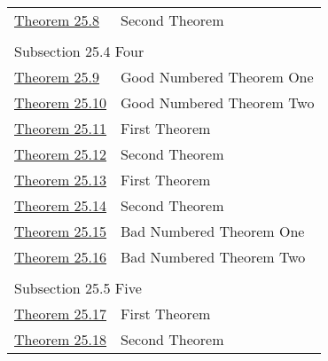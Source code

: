 \documentclass[10pt,]{article}
\theoremstyle{plain}
\theoremstyle{definition}
\theoremstyle{definition}
\theoremstyle{definition}
\theoremstyle{definition}
\theoremstyle{definition}
\theoremstyle{definition}
\numberwithin{equation}{section}
\begin{document}
\begin{longtable}[l]{ll}
\hyperref[theorem-number-08]{Theorem 25.8}& Second Theorem\\
\multicolumn{2}{l}{\null}\\[1.5ex] \multicolumn{2}{l}{\large Subsection 25.4 Four}\\[0.5ex]
\hyperref[theorem-good-one]{Theorem 25.9}& Good Numbered Theorem One\\
\hyperref[theorem-good-two]{Theorem 25.10}& Good Numbered Theorem Two\\
\hyperref[theorem-number-09]{Theorem 25.11}& First Theorem\\
\hyperref[theorem-number-10]{Theorem 25.12}& Second Theorem\\
\hyperref[theorem-number-11]{Theorem 25.13}& First Theorem\\
\hyperref[theorem-number-12]{Theorem 25.14}& Second Theorem\\
\hyperref[theorem-bad-one]{Theorem 25.15}& Bad Numbered Theorem One\\
\hyperref[theorem-bad-two]{Theorem 25.16}& Bad Numbered Theorem Two\\
\multicolumn{2}{l}{\null}\\[1.5ex] \multicolumn{2}{l}{\large Subsection 25.5 Five}\\[0.5ex]
\hyperref[theorem-number-13]{Theorem 25.17}& First Theorem\\
\hyperref[theorem-number-14]{Theorem 25.18}& Second Theorem\\
\end{longtable}
\typeout{************************************************}
\typeout{************************************************}
\end{document}
